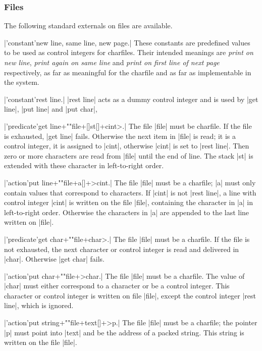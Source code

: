 \documentclass{article}
\newcommand\g[1]{{\sf #1}}
\begin{document}
\subsubsection{Files}\label{5.2.5}

The following standard externals on files are available.

\X\pp|'constant'new line, same line, new page.|\Y
These constants are predefined values to be used as control integers for
\g{charfiles}. Their intended meanings are \emph{print on new line},
\emph{print again on same line} and \emph{print on first line of next page}
respectively, as far as meaningful for the \g{charfile} and as far as
implementable in the system.

\X\pp|'constant'rest line.|\Y
\pp|rest line| acts as a dummy control integer and is used by \pp|get line|,
\pp|put line| and \pp|put char|,

\X\pp|'predicate'get line+""file+[]st[]+cint>.|\Y
The file \pp|file| must be charfile. If the file is exhausted, \pp|get line|
fails. Otherwise the next item in \pp|file| is read; it is a control
integer, it is assigned to \pp|cint|, otherwise \pp|cint| is set to \pp|rest
line|. Then zero or more characters are read from \pp|file| until the end of
line. The stack \pp|st| is extended with these character in left-to-right
order.

\X\pp|'action'put line+""file+a[]+>cint.|\Y
The file \pp|file| must be a charfile; \pp|a| must only contain values that
correspond to characters. If \pp|cint| is not \pp|rest line|, a line with
control integer \pp|cint| is written on the file \pp|file|, containing the
character in \pp|a| in left-to-right order. Otherwise the characters in
\pp|a| are appended to the last line written on \pp|file|.

\X\pp|'predicate'get char+""file+char>.|\Y
The file \pp|file| must be a charfile. If the file is not exhausted, the
next character or control integer is read and delivered in \pp|char|.
Otherwise \pp|get char| fails.

\X\pp|'action'put char+""file+>char.|\Y
The file \pp|file| must be a charfile. The value of \pp|char| must either
correspond to a character or be a control integer. This character or control
integer is written on file \pp|file|, except the control integer \pp|rest
line|, which is ignored.

\X\pp|'action'put string+""file+text[]+>p.|\Y
The file \pp|file| must be a charfile; the pointer \pp|p| must point into
\pp|text| and be the address of a packed string. This string is written on
the file \pp|file|.
\end{document}
